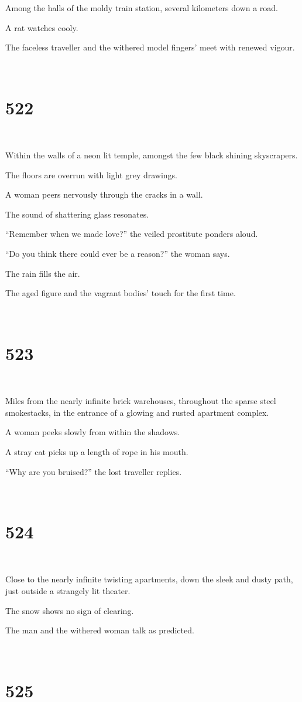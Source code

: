 \documentclass{report}
\begin{document}
Among the halls of the moldy train station, several kilometers down a road.

A rat watches cooly.

The faceless traveller and the withered model fingers' meet with renewed vigour.

~
\chapter*{522}
~

Within the walls of a neon lit temple, amongst the few black shining skyscrapers.

The floors are overrun with light grey drawings.

A woman peers nervously through the cracks in a wall.

The sound of shattering glass resonates.

``Remember when we made love?'' the veiled prostitute ponders aloud.

``Do you think there could ever be a reason?'' the woman says.

The rain fills the air.

The aged figure and the vagrant bodies' touch for the first time.

~
\chapter*{523}
~

Miles from the nearly infinite brick warehouses, throughout the sparse steel smokestacks, in the entrance of a glowing and rusted apartment complex.

A woman peeks slowly from within the shadows.

A stray cat picks up a length of rope in his mouth.

``Why are you bruised?'' the lost traveller replies.

~
\chapter*{524}
~

Close to the nearly infinite twisting apartments, down the sleek and dusty path, just outside a strangely lit theater.

The snow shows no sign of clearing.

The man and the withered woman talk as predicted.

~
\chapter*{525}
~
\end{document}
